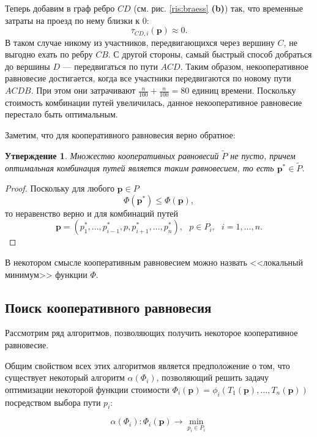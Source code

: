 \documentclass[12pt, a4paper]{article}
\newtheorem{state}{Утверждение}[section]
\begin{document}
Теперь добавим в граф ребро $CD$ (см. рис. \ref{ris:braess} \textbf{(b)}) так, что временные затраты на проезд по нему близки к 0:
$$\overline{\tau}_{CD, i} (\textbf{p}) \approx 0.$$
В таком случае никому из участников, передвигающихся через вершину $C$, не выгодно ехать по ребру $CB$. С другой стороны, самый быстрый способ добраться до вершины $D$ --- передвигаться по пути $ACD$. Таким образом, некооперативное равновесие достигается, когда все участники передвигаются по новому пути $ACDB$. При этом они затрачивают $\frac{n}{100} + \frac{n}{100} = 80$ единиц времени. Поскольку стоимость комбинации путей увеличилась, данное некооперативное равновесие перестало быть оптимальным.

Заметим, что для кооперативного равновесия верно обратное:

\begin{state}
Множество кооперативных равновесий $\widetilde{P}$ не пусто, причем
оптимальная комбинация путей является таким равновесием, то есть $\textbf{p}^* \in \widetilde{P}$.
\end{state}

\begin{proof}
	Поскольку для любого $\textbf{p} \in P$ 
	$$\Phi (\textbf{p}^*) \le \Phi (\textbf{p}),$$
	то неравенство верно и для комбинаций путей $$\textbf{p} = \left(p^*_1, \ldots, p^*_{i - 1}, p, p^*_{i + 1}, \ldots, p^*_{n} \right), \text{ } p \in P_i, \text{ } i = 1, \ldots, n.$$
\end{proof}

В некотором смысле кооперативным равновесием можно назвать <<локальный минимум>> функции $\Phi$.

\subsection{Поиск кооперативного равновесия}
Рассмотрим ряд алгоритмов, позволяющих получить некоторое кооперативное равновесие.

Общим свойством всех этих алгоритмов является предположение о том, что существует некоторый алгоритм $\alpha (\Phi_i)$, позволяющий решить задачу оптимизации некоторой функции стоимости $\Phi_i (\textbf{p}) = \phi_i(T_1(\textbf{p}), \ldots, T_n(\textbf{p}))$ посредством выбора пути $p_i$:

\begin{equation}
\label{eq:task_mini}
\alpha (\Phi_i): \Phi_i (\textbf{p}) \rightarrow \min \limits _{p_i \in P_i}
\end{equation}
\end{document}
